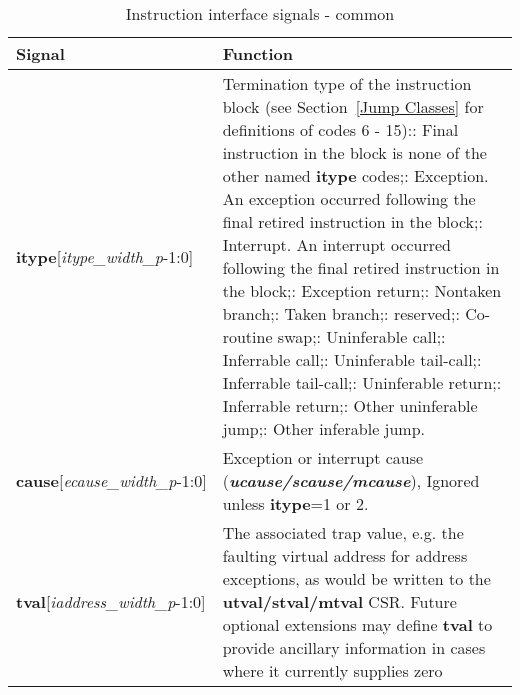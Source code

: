 \begin{table}[htp]
    \centering
    \caption{Instruction interface signals - common}
    \label{tab:common-ingress}
    \begin{tabulary}{\textwidth}{|l|p{80mm}|}
        \hline
        \textbf {Signal} & \textbf {Function} \\
        \hline
        \textbf{itype}[\textit{itype\_width\_p}-1:0] & Termination type of the instruction block (see Section~\ref{Jump Classes} for definitions of codes 6 - 15):: Final instruction in the block is none of the other named \textbf{itype} codes;: Exception. An exception occurred following the final retired instruction in the block;: Interrupt. An interrupt occurred following the final retired instruction in the block;: Exception return;: Nontaken branch;: Taken branch;: reserved;: Co-routine swap;: Uninferable call;: Inferrable call;: Uninferable tail-call;: Inferrable tail-call;: Uninferable return;: Inferrable return;: Other uninferable jump;: Other inferable jump.\\
        \hline
        \textbf{cause}[\textit{ecause\_width\_p}-1:0] & Exception or interrupt cause (\textbf{\textit{ucause/scause/mcause}}), \newline
        Ignored unless \textbf {itype}=1 or 2.\\
        \hline
        \textbf{tval}[\textit{iaddress\_width\_p}-1:0]& The associated trap value, e.g. the
    faulting virtual address for address exceptions, as would be
    written to the \textbf{utval/stval/mtval} CSR. Future optional extensions may define \textbf{tval} to provide ancillary information in cases where it currently supplies zero\newline

\end{tabulary}
\end{table}
